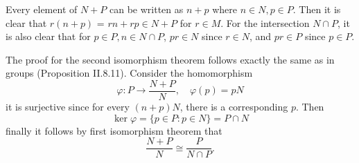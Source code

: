 \begin{pf}
Every element of $N+P$ can be written as $n+p$ where $n \in N, p \in P$. Then it is clear that $r(n+p)$ = $rn + rp \in N+P$ for $r \in M$. For the intersection $N \cap P$, it is also clear that for $p \in P, n \in N \cap P$, $pr \in N$ since $r \in N$, and $pr \in P$ since $p \in P$.

The proof for the second isomorphism theorem follows exactly the same as in groups (Proposition II.8.11). Consider the homomorphism
\[
\varphi: P \to \frac{N+P}{N}, \quad \varphi(p) = pN	
\]
it is surjective since for every $(n+p)N$, there is a corresponding $p$. Then
\[
\ker \varphi = \{p \in P : p \in N\} = P \cap N	
\]
finally it follows by first isomorphism theorem that 
\[
\frac{N+P}{N} \cong \frac{P}{N \cap P}.
\]
\end{pf}

\section{}

